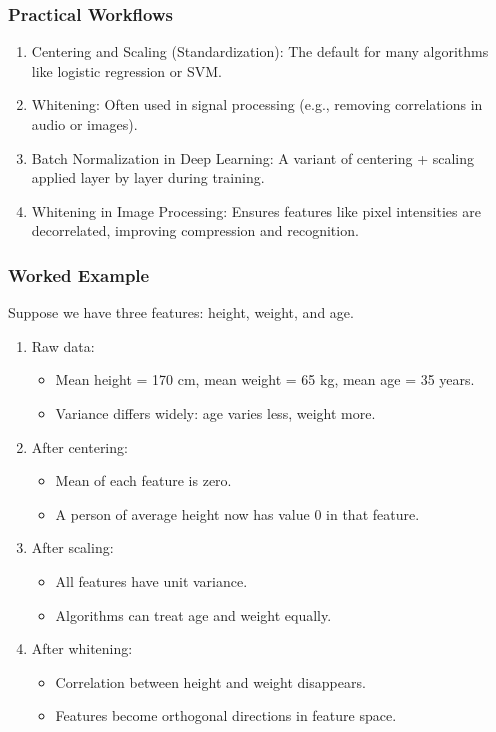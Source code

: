 \documentclass[
  letterpaper,
  DIV=11,
  numbers=noendperiod]{scrreprt}
\providecommand{\tightlist}{%
  \setlength{\itemsep}{0pt}\setlength{\parskip}{0pt}}
\begin{document}
\subsubsection{Practical Workflows}\label{practical-workflows}

\begin{enumerate}
\def\labelenumi{\arabic{enumi}.}
\tightlist
\item
  Centering and Scaling (Standardization): The default for many
  algorithms like logistic regression or SVM.
\item
  Whitening: Often used in signal processing (e.g., removing
  correlations in audio or images).
\item
  Batch Normalization in Deep Learning: A variant of centering + scaling
  applied layer by layer during training.
\item
  Whitening in Image Processing: Ensures features like pixel intensities
  are decorrelated, improving compression and recognition.
\end{enumerate}

\subsubsection{Worked Example}\label{worked-example}

Suppose we have three features: height, weight, and age.

\begin{enumerate}
\def\labelenumi{\arabic{enumi}.}
\item
  Raw data:

  \begin{itemize}
  \tightlist
  \item
    Mean height = 170 cm, mean weight = 65 kg, mean age = 35 years.
  \item
    Variance differs widely: age varies less, weight more.
  \end{itemize}
\item
  After centering:

  \begin{itemize}
  \tightlist
  \item
    Mean of each feature is zero.
  \item
    A person of average height now has value 0 in that feature.
  \end{itemize}
\item
  After scaling:

  \begin{itemize}
  \tightlist
  \item
    All features have unit variance.
  \item
    Algorithms can treat age and weight equally.
  \end{itemize}
\item
  After whitening:

  \begin{itemize}
  \tightlist
  \item
    Correlation between height and weight disappears.
  \item
    Features become orthogonal directions in feature space.
  \end{itemize}
\end{enumerate}
\end{document}
